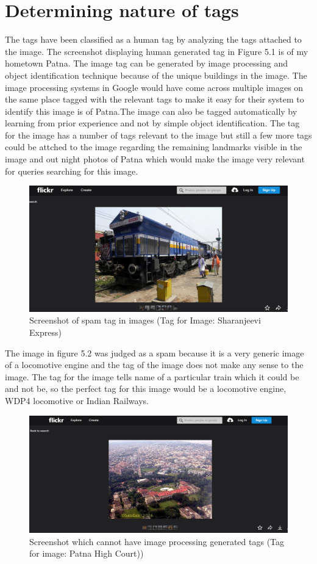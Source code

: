\documentclass[12pt]{report}
\begin{document}
\section{Determining nature of tags}
The tags have been classified as a human tag by analyzing the tags attached to the image.  The screenshot displaying human generated tag in Figure 5.1 is of my hometown Patna. The image tag can be generated by image processing and object identification technique because of the unique buildings in the image. The image processing systems in Google would have come across multiple images on the same place tagged with the relevant tags to make it easy for their system to identify this image is of Patna.The image can also be tagged automatically by learning from prior experience and not by simple object identification. The tag for the image has a number of tags relevant to the image but still a few more tags could be attched to the image regarding the remaining landmarks visible in the image and out night photos of Patna which would make the image very relevant for queries searching for this image.\\
\begin{figure}[ht]
  \centering
  \includegraphics[width=1\textwidth]{Problem11_11/Spam.png}
  \caption{Screenshot of spam tag in images (Tag for Image: Sharanjeevi Express)}
  \label{fig:1}
\end{figure}
The image in figure 5.2 was judged as a spam because it is a very generic image of a locomotive engine and the tag of the image does not make any sense to the image. The tag for the image tells name of a particular train which it could be and not be, so the perfect tag for this image would be a locomotive engine, WDP4 locomotive or Indian Railways.\\
\begin{figure}[ht]
  \centering
  \includegraphics[width=1\textwidth]{Problem11_11/HumanTag1.png}
  \caption{Screenshot which cannot have image processing generated tags (Tag for image: Patna High Court))}
  \label{fig:1}
\end{figure}
\end{document}
